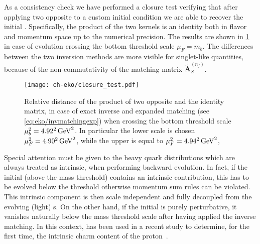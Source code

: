 As a consistency check we have performed a closure test verifying that after
applying two opposite \ekos{} to a custom initial condition
we are able to recover the initial \pdf{}. Specifically, the product of the
two kernels is an identity both in flavor and momentum space up to
the numerical precision. The results are shown in \cref{fig:closure_test} in case of \nnlo{} evolution
crossing the bottom threshold scale $\mu_{F}=m_{b}$. The differences between
the two inversion methods are more visible for singlet-like quantities,
because of the non-commutativity of the matching matrix $\tilde{\mathbf{A}}_{S}^{(n_f)}$.  

\begin{figure}
    \begin{center}
    \texttt{[image: ch-eko/closure\_test.pdf]}
    \end{center}
    \caption{Relative distance of the product of two opposite \nnlo{} \ekos{}
        and the identity matrix, in case of exact inverse and expanded
        matching (see \cref{eq:eko/invmatchingexp}) when crossing the bottom
        threshold scale $\mu_{b}^2=\SI[parse-numbers=false]{4.92^2}{\GeV^2}$. In particular the lower scale is chosen $\muF^2=\SI[parse-numbers=false]{4.90^2}{\GeV^2}$, 
        while the upper is equal to $\muF^2=\SI[parse-numbers=false]{4.94^2}{\GeV^2}$, 
        \label{fig:closure_test}
    }
\end{figure}

Special attention must be given to the heavy quark distributions which are
always treated as intrinsic, when performing backward evolution.
In fact, if the initial \pdf{} (above the mass threshold) contains an intrinsic contribution, this has to be evolved
below the threshold otherwise momentum sum rules can be violated.
This intrinsic component is then scale independent and fully decoupled
from the evolving (light) \pdf{}s.
On the other hand, if the initial \pdf{} is purely perturbative, it vanishes
naturally below the mass threshold scale after having applied the
inverse matching.
In this context, \eko{} has been used in a recent study to determine, for the first time,
the intrinsic charm content of the proton~\cite{Ball:2022qks}.

